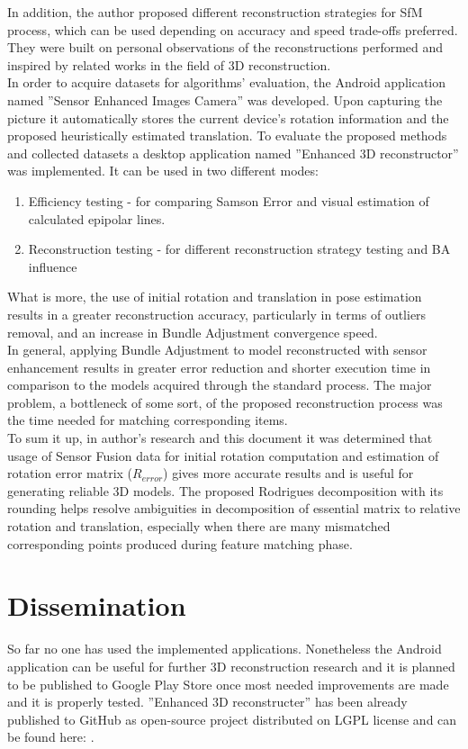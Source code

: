 In addition, the author proposed different reconstruction strategies for SfM process, which can be used depending on accuracy and speed trade-offs preferred. They were built on personal observations of the reconstructions performed and inspired by related works in the field of 3D reconstruction. \\
In order to acquire datasets for algorithms' evaluation, the Android application named ''Sensor Enhanced Images Camera'' was developed. Upon capturing the picture it automatically stores the current device's rotation information and the proposed heuristically estimated translation. 
To evaluate the proposed methods and collected datasets a desktop application named ''Enhanced 3D reconstructor'' was implemented.
It can be used in two different modes:
\begin{enumerate}
\item Efficiency testing - for comparing  Samson Error and visual estimation of calculated epipolar lines.
\item Reconstruction testing - for different reconstruction strategy testing and BA influence    
\end{enumerate}
 What is more, the use of initial rotation and translation in pose estimation results in a greater reconstruction accuracy, particularly in terms of outliers removal, and an increase in Bundle Adjustment convergence speed. \\
In general, applying Bundle Adjustment to model reconstructed with sensor enhancement results in greater error reduction and shorter execution time in comparison to the models acquired through the standard process. The major problem, a bottleneck of some sort, of the proposed reconstruction process was the time needed for matching corresponding items. \\
To sum it up, in author's research and this document it was determined that usage of Sensor Fusion data for initial rotation computation and estimation of rotation error matrix ($R_{error}$) gives more accurate results and is useful for generating reliable 3D models. The proposed Rodrigues decomposition with its rounding helps resolve ambiguities in decomposition of essential matrix to relative rotation and translation, especially when there are many mismatched corresponding points produced during feature matching phase. 
\section{Dissemination}
So far no one has used the implemented applications. Nonetheless the Android application can be useful for further 3D reconstruction research and it is planned to be published to Google Play Store once most needed improvements are made and it is properly tested. ''Enhanced 3D reconstructer'' has been already published to GitHub as open-source project distributed on LGPL license and can be found here: \cite{website:3dReconstructerMasterThesis}.
